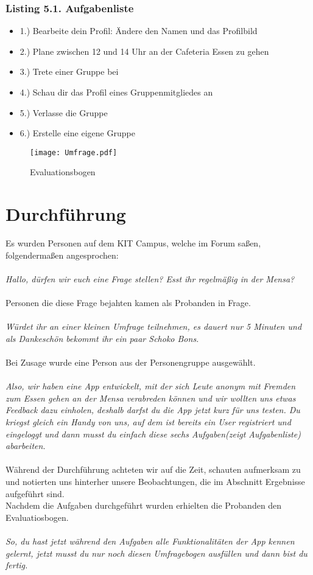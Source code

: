 \documentclass[a4paper]{scrreprt}
\begin{document}
\subsubsection*{Listing 5.1. Aufgabenliste}
\begin{itemize}
	\item 1.) Bearbeite dein Profil: Ändere den Namen und das Profilbild
	\item 2.) Plane zwischen 12 und 14 Uhr an der Cafeteria Essen zu gehen
	\item 3.) Trete einer Gruppe bei
	\item 4.) Schau dir das Profil eines Gruppenmitgliedes an
	\item 5.) Verlasse die Gruppe
	\item 6.) Erstelle eine eigene Gruppe
\end{itemize}
\newpage
\begin{figure}[H]
	\centering
  \texttt{[image: Umfrage.pdf]}
	\caption{Evaluationsbogen}
	\label{fig2}
\end{figure}
\newpage

\section{Durchführung}
Es wurden Personen auf dem KIT Campus, welche im Forum saßen, folgendermaßen angesprochen: \\
\ \\
\textit{Hallo, dürfen wir euch eine Frage stellen? Esst ihr regelmäßig in der Mensa?} \\ 
\ \\
Personen die diese Frage bejahten kamen als Probanden in Frage. \\
\ \\
\textit{Würdet ihr an einer kleinen Umfrage teilnehmen, es dauert nur 5 Minuten und als Dankeschön bekommt ihr ein paar Schoko Bons.}  \\ 
\ \\
Bei Zusage wurde eine Person aus der Personengruppe ausgewählt.\\
\ \\
\textit{Also, wir haben eine App entwickelt, mit der sich Leute anonym mit Fremden zum Essen gehen an der Mensa verabreden können und wir wollten uns etwas Feedback dazu einholen, deshalb darfst du die App jetzt kurz für uns testen. Du kriegst gleich ein Handy von uns, auf dem ist bereits ein User registriert und eingeloggt und dann musst du einfach diese sechs Aufgaben(zeigt Aufgabenliste) abarbeiten.} \\
\ \\
Während der Durchführung achteten wir auf die Zeit, schauten aufmerksam zu und notierten uns hinterher unsere Beobachtungen, die im Abschnitt Ergebnisse aufgeführt sind. \\
Nachdem die Aufgaben durchgeführt wurden erhielten die Probanden den Evaluatiosbogen.\\
\ \\
\textit{So, du hast jetzt während den Aufgaben alle Funktionalitäten der App kennen gelernt, jetzt musst du nur noch diesen Umfragebogen ausfüllen und dann bist du fertig.}
\end{document}
